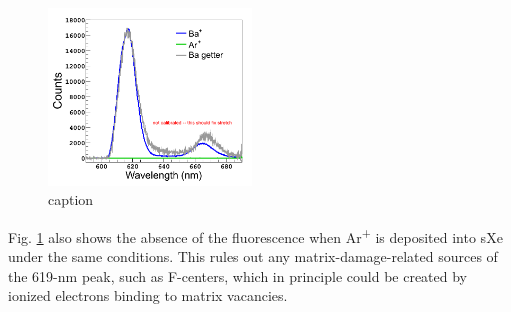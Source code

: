 \documentclass[aps,pra,reprint,superscriptaddress]{revtex4-1}
\begin{document}
\begin{figure}
\includegraphics[width=0.48\textwidth]{figures/getter_ion_Ar.png}
\caption{caption}
\label{fig:ion_getter_ar}
\end{figure}

Fig. \ref{fig:ion_getter_ar} also shows the absence of the fluorescence when Ar\textsuperscript{+} is deposited into sXe under the same conditions.  This rules out any matrix-damage-related sources of the 619-nm peak, such as F-centers, which in principle could be created by ionized electrons binding to matrix vacancies.  
\end{document}
